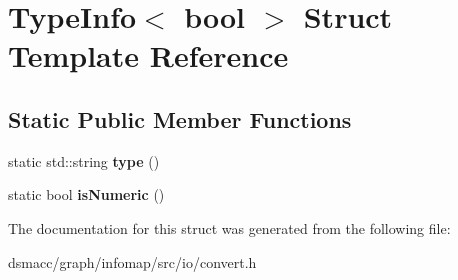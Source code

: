 \hypertarget{structTypeInfo_3_01bool_01_4}{}\section{Type\+Info$<$ bool $>$ Struct Template Reference}
\label{structTypeInfo_3_01bool_01_4}
\subsection*{Static Public Member Functions}
\begin{DoxyCompactItemize}
\item 
\mbox{\label{structTypeInfo_3_01bool_01_4_a68101da22a7df0c5f7a7e3c20fb9ff43}} 
static std\+::string {\bfseries type} ()
\item 
\mbox{\label{structTypeInfo_3_01bool_01_4_aeabb499a9cdb9ed670686d6ad8fcd0d7}} 
static bool {\bfseries is\+Numeric} ()
\end{DoxyCompactItemize}


The documentation for this struct was generated from the following file\+:\begin{DoxyCompactItemize}
\item 
dsmacc/graph/infomap/src/io/convert.\+h\end{DoxyCompactItemize}
